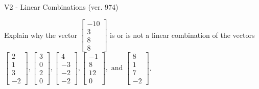 \begin{exercise}
  \begin{exerciseTitle}V2 - Linear Combinations (ver. 974)\end{exerciseTitle}
  \begin{exerciseStatement}
    Explain why the vector \(\left[\begin{array}{c}
-10 \\
3 \\
8 \\
8
\end{array}\right]\)  is or is not a linear 
	combination of the vectors \(\left[\begin{array}{c}
2 \\
1 \\
3 \\
-2
\end{array}\right] , \left[\begin{array}{c}
3 \\
0 \\
2 \\
0
\end{array}\right] , \left[\begin{array}{c}
4 \\
-3 \\
-2 \\
-2
\end{array}\right] , \left[\begin{array}{c}
-1 \\
8 \\
12 \\
0
\end{array}\right] , \text{ and } \left[\begin{array}{c}
8 \\
1 \\
7 \\
-2
\end{array}\right]\).
	



\end{exerciseStatement}
\end{exercise}
